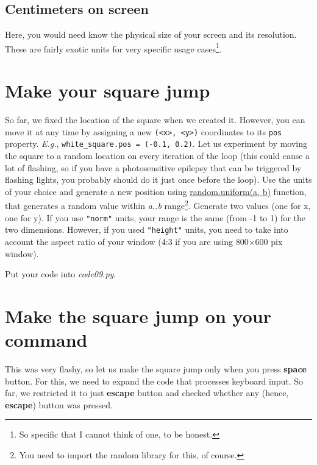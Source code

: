 \documentclass[
]{book}
\begin{document}
\hypertarget{centimeters-on-screen}{%
\subsection{Centimeters on screen}\label{centimeters-on-screen}}

Here, you would need know the physical size of your screen and its resolution. These are fairly exotic units for very specific usage cases\footnote{So specific that I cannot think of one, to be honest.}.

\hypertarget{make-your-square-jump}{%
\section{Make your square jump}\label{make-your-square-jump}}

So far, we fixed the location of the square when we created it. However, you can move it at any time by assigning a new \texttt{(\textless{}x\textgreater{},\ \textless{}y\textgreater{})} coordinates to its \texttt{pos} property. \emph{E.g.}, \texttt{white\_square.pos\ =\ (-0.1,\ 0.2)}. Let us experiment by moving the square to a random location on every iteration of the loop (this could cause a lot of flashing, so if you have a photosensitive epilepsy that can be triggered by flashing lights, you probably should do it just once before the loop). Use the units of your choice and generate a new position using \href{https://docs.python.org/3/library/random.html\#random.uniform}{random.uniform(a, b)} function, that generates a random value within \emph{a..b} range\footnote{You need to import the random library for this, of course.}. Generate two values (one for x, one for y). If you use \texttt{"norm"} units, your range is the same (from -1 to 1) for the two dimensions. However, if you used \texttt{"height"} units, you need to take into account the aspect ratio of your window (4:3 if you are using 800×600 pix window).

Put your code into \emph{code09.py}.

\hypertarget{make-the-square-jump-on-your-command}{%
\section{Make the square jump on your command}\label{make-the-square-jump-on-your-command}}

This was very flashy, so let us make the square jump only when you press \textbf{space} button. For this, we need to expand the code that processes keyboard input. So far, we restricted it to just \textbf{escape} button and checked whether any (hence, \textbf{escape}) button was pressed.
\end{document}
